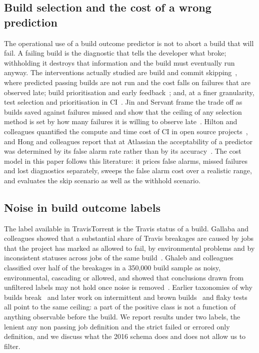 \documentclass[sigconf,review,anonymous,nonacm]{acmart}
\begin{document}
\subsection{Build selection and the cost of a wrong prediction}
\label{sec:related-cost}

The operational use of a build outcome predictor is not to abort a build that will fail. A failing build is the diagnostic that tells the developer what broke; withholding it destroys that information and the build must eventually run anyway. The interventions actually studied are build and commit skipping~\cite{abdalkareem2021skip, abdalkareem2021ml, jin2020, jin2022}, where predicted passing builds are not run and the cost falls on failures that are observed late; build prioritisation and early feedback~\cite{hassanwang2017}; and, at a finer granularity, test selection and prioritisation in CI~\cite{elbaum2014}. Jin and Servant frame the trade off as builds saved against failures missed and show that the ceiling of any selection method is set by how many failures it is willing to observe late~\cite{jin2022}. Hilton and colleagues quantified the compute and time cost of CI in open source projects~\cite{hilton2016}, and Hong and colleagues report that at Atlassian the acceptability of a predictor was determined by its false alarm rate rather than by its accuracy~\cite{hong2024atlassian}. The cost model in this paper follows this literature: it prices false alarms, missed failures and lost diagnostics separately, sweeps the false alarm cost over a realistic range, and evaluates the skip scenario as well as the withhold scenario.

\subsection{Noise in build outcome labels}
\label{sec:related-noise}

The label available in TravisTorrent is the Travis status of a build. Gallaba and colleagues showed that a substantial share of Travis breakages are caused by jobs that the project has marked as allowed to fail, by environmental problems and by inconsistent statuses across jobs of the same build~\cite{gallaba2018}. Ghaleb and colleagues classified over half of the breakages in a 350{,}000 build sample as noisy, environmental, cascading or allowed, and showed that conclusions drawn from unfiltered labels may not hold once noise is removed~\cite{ghaleb2021noise}. Earlier taxonomies of why builds break~\cite{kerzazi2014, rausch2017, vassallo2017} and later work on intermittent and brown builds~\cite{lampel2021, olewicki2022} and flaky tests~\cite{luo2014} all point to the same ceiling: a part of the positive class is not a function of anything observable before the build. We report results under two labels, the lenient any non passing job definition and the strict failed or errored only definition, and we discuss what the 2016 schema does and does not allow us to filter.
\end{document}
